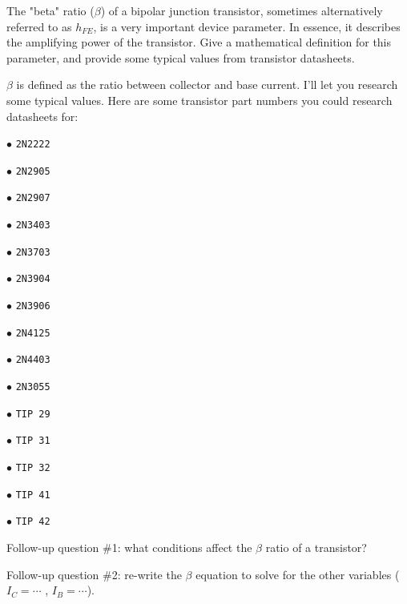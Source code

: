 

The "beta" ratio ($\beta$) of a bipolar junction transistor, sometimes alternatively referred to as $h_{FE}$, is a very important device parameter.  In essence, it describes the amplifying power of the transistor.  Give a mathematical definition for this parameter, and provide some typical values from transistor datasheets.







$\beta$ is defined as the ratio between collector and base current.  I'll let you research some typical values.  Here are some transistor part numbers you could research datasheets for:

\medskip
\goodbreak
\item{$\bullet$} {\tt 2N2222}
\item{$\bullet$} {\tt 2N2905}
\item{$\bullet$} {\tt 2N2907}
\item{$\bullet$} {\tt 2N3403}
\item{$\bullet$} {\tt 2N3703}
\item{$\bullet$} {\tt 2N3904}
\item{$\bullet$} {\tt 2N3906}
\item{$\bullet$} {\tt 2N4125}
\item{$\bullet$} {\tt 2N4403}
\item{$\bullet$} {\tt 2N3055}
\item{$\bullet$} {\tt TIP 29}
\item{$\bullet$} {\tt TIP 31}
\item{$\bullet$} {\tt TIP 32}
\item{$\bullet$} {\tt TIP 41}
\item{$\bullet$} {\tt TIP 42}
\medskip

\vskip 10pt

Follow-up question \#1: what conditions affect the $\beta$ ratio of a transistor?

\vskip 10pt

Follow-up question \#2: re-write the $\beta$ equation to solve for the other variables ($I_C = \cdots$ , $I_B = \cdots$).







